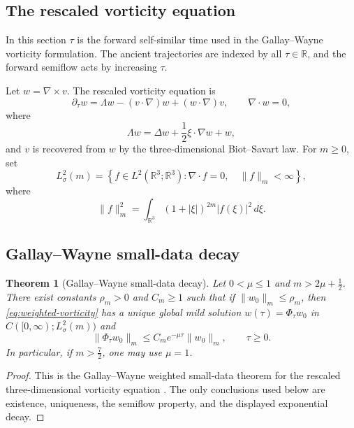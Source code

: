 \documentclass[11pt]{amsart}
\theoremstyle{plain}
\newtheorem{theorem}{Theorem}[section]
\theoremstyle{definition}
\theoremstyle{remark}
\numberwithin{equation}{section}
\begin{document}
\subsection{The rescaled vorticity equation}

In this section \(\tau\) is the forward self-similar time used in the
Gallay--Wayne vorticity formulation.  The ancient trajectories are indexed by
all \(\tau\in\mathbb R\), and the forward semiflow acts by increasing
\(\tau\).

Let \(w=\nabla\times v\).  The rescaled vorticity equation is
\begin{equation}\label{eq:weighted-vorticity}
   \partial_\tau w
   =
   \Lambda w-(v\cdot\nabla)w+(w\cdot\nabla)v,
   \qquad \nabla\cdot w=0,
\end{equation}
where
\begin{equation}\label{eq:lambda}
   \Lambda w=\Delta w+\frac12\xi\cdot\nabla w+w,
\end{equation}
and \(v\) is recovered from \(w\) by the three-dimensional Biot--Savart law.
For \(m\ge0\), set
\[
   L^2_\sigma(m)
   =
   \left\{
      f\in L^2(\mathbb R^3;\mathbb R^3):
      \nabla\cdot f=0,\quad \|f\|_m<\infty
   \right\},
\]
where
\[
   \|f\|_m^2
   =
   \int_{\mathbb R^3}(1+|\xi|)^{2m}|f(\xi)|^2\,d\xi .
\]

\subsection{Gallay--Wayne small-data decay}

\begin{theorem}[Gallay--Wayne small-data decay]\label{thm:gallay}
Let \(0<\mu\le1\) and \(m>2\mu+\frac12\).  There exist constants
\(\rho_m>0\) and \(C_m\ge1\) such that if \(\|w_0\|_m\le\rho_m\), then
\eqref{eq:weighted-vorticity} has a unique global mild solution
\(w(\tau)=\Phi_\tau w_0\) in \(C([0,\infty);L^2_\sigma(m))\) and
\[
   \|\Phi_\tau w_0\|_m
   \le
   C_m e^{-\mu\tau}\|w_0\|_m,\qquad \tau\ge0.
\]
In particular, if \(m>\frac72\), one may use \(\mu=1\).
\end{theorem}

\begin{proof}
This is the Gallay--Wayne weighted small-data theorem for the rescaled
three-dimensional vorticity equation \cite{GallayWayne2002}.  The only
conclusions used below are existence, uniqueness, the semiflow property, and
the displayed exponential decay.
\end{proof}
\end{document}
